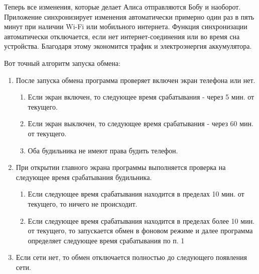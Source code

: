 \documentclass[a4paper,10pt,russian]{sphinxmanual}
\begin{document}
\noindent{}
\noindent{}
\noindent{}
\noindent{}

Теперь все изменения, которые делает Алиса отправляются Бобу и наоборот. Приложение синхронизирует изменения
автоматически примерно один раз в пять минут при наличии Wi-Fi или мобильного интернета. Функция синхронизации
автоматически отключается, если нет интернет-соединения или во время сна устройства. Благодаря этому
экономится трафик и электроэнергия аккумулятора.

Вот точный алгоритм запуска обмена:
\begin{enumerate}
\def\theenumi{\arabic{enumi}}
\def\labelenumi{\theenumi .}
\makeatletter\def\p@enumii{\p@enumi \theenumi .}\makeatother
\item {} 
После запуска обмена программа проверяет включен экран телефона или нет.
\begin{enumerate}
\def\theenumii{\arabic{enumii}}
\def\labelenumii{\theenumii .}
\makeatletter\def\p@enumiii{\p@enumii \theenumii .}\makeatother
\item {} 
Если экран включен, то следующее время срабатывания - через 5 мин. от текущего.

\item {} 
Если экран выключен, то следующее время срабатывания - через 60 мин. от текущего.

\item {} 
Оба будильника не имеют права будить телефон.

\end{enumerate}

\item {} 
При открытии главного экрана программы выполняется проверка на следующее время срабатывания будильника.
\begin{enumerate}
\def\theenumii{\arabic{enumii}}
\def\labelenumii{\theenumii .}
\makeatletter\def\p@enumiii{\p@enumii \theenumii .}\makeatother
\item {} 
Если следующее время срабатывания находится в пределах 10 мин. от текущего, то ничего не происходит.

\item {} 
Если следующее время срабатывания находится в пределах более 10 мин. от текущего, то запускается обмен в фоновом режиме и далее программа определяет следующее время срабатывания по п. 1

\end{enumerate}

\item {} 
Если сети нет, то обмен отключается полностью до следующего появления сети.

\end{enumerate}
\end{document}
